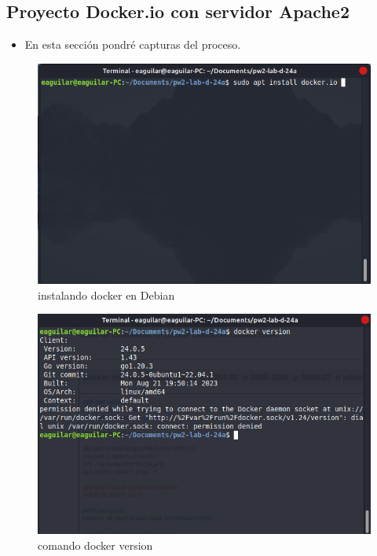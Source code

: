 \documentclass{article}
\begin{document}
\begin{itemize}
        \subsection{Proyecto Docker.io con servidor Apache2                                
        }
	\begin{itemize}
		\item En esta sección pondré capturas del proceso.
	\end{itemize}	
        \begin{figure}[H]
  \centering
  \includegraphics[width=1\textwidth]{img/Pictures/instalarDocker.png}
  \caption{instalando docker en Debian}
  \label{fig:imagen1}
\end{figure}
  \begin{figure}[H]
  \centering
  \includegraphics[width=1\textwidth]{img/Pictures/dockerVersion.png}
  \caption{comando docker version}
  \label{fig:imagen1}
\end{figure}

\end{itemize}
\end{document}
